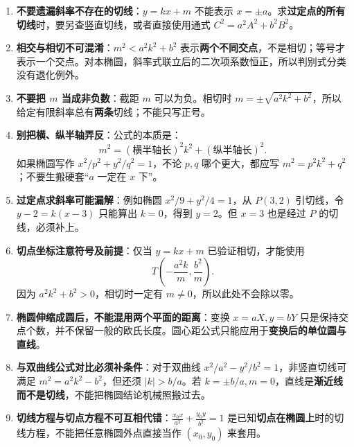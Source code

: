 \begin{trapbox}
\begin{enumerate}
    \item \textbf{不要遗漏斜率不存在的切线}：$y=kx+m$ 不能表示 $x=\pm a$。求\textbf{过定点的所有切线}时，要另查竖直切线，或者直接使用通式 $C^2=a^2A^2+b^2B^2$。

    \item \textbf{相交与相切不可混淆}：$m^2<a^2k^2+b^2$ 表示\textbf{两个不同交点}，不是相切；等号才表示一个交点。对本椭圆，斜率式联立后的二次项系数恒正，所以判别式分类没有退化例外。

    \item \textbf{不要把 $m$ 当成非负数}：截距 $m$ 可以为负。相切时 $m=\pm\sqrt{a^2k^2+b^2}$，所以给定有限斜率总有\textbf{两条}切线；不能只写正号。

    \item \textbf{别把横、纵半轴弄反}：公式的本质是：
    \[
    m^2=(\text{横半轴长})^2k^2+(\text{纵半轴长})^2.
    \]
    如果椭圆写作 $x^2/p^2+y^2/q^2=1$，不论 $p,q$ 哪个更大，都应写 $m^2=p^2k^2+q^2$；不要生搬硬套“$a$ 一定在 $x$ 下”。

    \item \textbf{过定点求斜率可能漏解}：例如椭圆 $x^2/9+y^2/4=1$，从 $P(3,2)$ 引切线，令 $y-2=k(x-3)$ 只能算出 $k=0$，得到 $y=2$。但 $x=3$ 也是经过 $P$ 的切线，必须补上。

    \item \textbf{切点坐标注意符号及前提}：仅当 $y=kx+m$ 已验证相切，才能使用
    \[
    T\left(-\frac{a^2k}{m},\frac{b^2}{m}\right).
    \]
    因为 $a^2k^2+b^2>0$，相切时一定有 $m\ne0$，所以此处不会除以零。

    \item \textbf{椭圆伸缩成圆后，不能混用两个平面的距离}：变换 $x=aX,y=bY$ 只是保持交点个数，并不保留一般的欧氏长度。圆心距公式只能应用于\textbf{变换后的单位圆与直线}。

    \item \textbf{与双曲线公式对比必须补条件}：对于双曲线 $x^2/a^2-y^2/b^2=1$，非竖直切线可满足 $m^2=a^2k^2-b^2$，但还须 $|k|>b/a$。若 $k=\pm b/a,m=0$，直线是\textbf{渐近线而不是切线}，不能把椭圆结论机械照搬过去。

    \item \textbf{切线方程与切点方程不可互相代错}：$\frac{x_0x}{a^2}+\frac{y_0y}{b^2}=1$ 是已知\textbf{切点在椭圆上}时的切线方程，不能把任意椭圆外点直接当作 $(x_0,y_0)$ 来套用。
\end{enumerate}
\end{trapbox}
